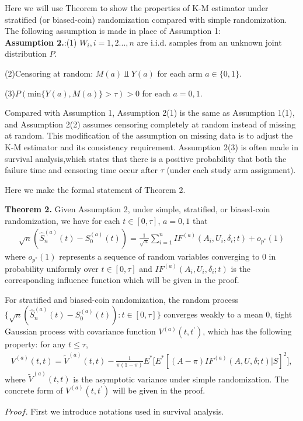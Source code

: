 \documentclass{article}
\begin{document}
Here we will use Theorem to show the properties of K-M estimator under stratified (or biased-coin) randomization compared with simple randomization.
The following assumption is made in place of Assumption 1:\\
\textbf{Assumption 2.}:(1) $W_i,i=1,2...,n$ are i.i.d. samples from an unknown joint distribution
$P$.

(2)Censoring at random: $M(a) \Vbar Y(a)$ for each arm $a \in \{0, 1\}$. 

(3)$P(\mathrm{min}\{Y(a),M(a)\} >\tau)>0$ for each $a=0,1$.

Compared with Assumption 1, Assumption 2(1) is the same as Assumption 1(1), and Assumption 2(2) assumes censoring completely at random instead of missing at random. This modification
of the assumption on missing data is to adjust
the K-M estimator and its consistency requirement. Assumption 2(3) is often made in survival
analysis,which states that there is a positive probability that both
the failure time and censoring time occur after $\tau$ (under each study arm assignment).

Here we make the formal statement of Theorem 2.

\textbf{Theorem 2.} Given Assumption 2, under simple, stratified, or biased-coin randomization, we have for each $t\in [0,\tau]$, $a=0,1$ that
\begin{align}\label{if sur}
    \sqrt{n}(\hat{S}_n^{(a)}(t)-S_0^{(a)}(t))=\frac{1}{\sqrt{n}}\sum_{i=1}^n IF^{(a)}(A_i,U_i,\delta_i;t)+o_{p^*}(1)
\end{align}
where $o_{p^*}(1)$ represents a sequence of random variables converging
to 0 in probability uniformly over $t\in [0,\tau]$ and $IF^{(a)}(A_i,U_i,\delta_i;t)$ is the corresponding influence function which will be given in the proof.

For stratified and biased-coin randomization, the random process $\{\sqrt{n}(\hat{S}_n^{(a)}(t)-S_0^{(a)}(t)): t\in [0,\tau]\}$ converges weakly to a mean 0, tight Gaussian process with covariance function $V^{(a)}(t,t^{\prime})$, which has the following property: for any $t\leq \tau$,
\begin{align}
    V^{(a)}(t,t)=\widetilde{V}^{(a)}(t,t)-\frac{1}{\pi(1-\pi)}E^{*}\big[E^{*}[(A-\pi)IF^{(a)}(A,U,\delta;t)|S]^2\big],
\end{align}
where $\widetilde{V}^{(a)}(t,t)$ is the asymptotic variance under simple randomization. The concrete form of $V^{(a)}(t,t^{\prime})$ will be given in the proof.

$Proof.$ First we introduce notations used in survival analysis.
\end{document}
